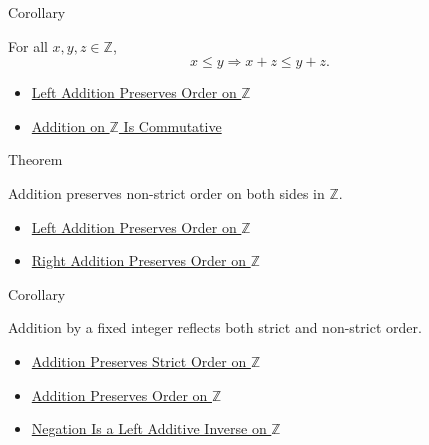 \begin{corollarybox}{Corollary}
\begin{corollary}
\label{cor:right-addition-preserves-order-on-z}
For all $x,y,z\in\mathbb{Z}$,
\[
x\le y \Longrightarrow x+z\le y+z.
\]
\end{corollary}
\end{corollarybox}

\begin{dependencies}
\begin{itemize}
  \item \hyperref[thm:left-addition-preserves-order-on-z]{Left Addition Preserves Order on $\mathbb{Z}$}
  \item \hyperref[thm:addition-on-z-commutative]{Addition on $\mathbb{Z}$ Is Commutative}
\end{itemize}
\end{dependencies}

\begin{theorembox}{Theorem}
\begin{theorem}
\label{thm:addition-preserves-order-on-z}
Addition preserves non-strict order on both sides in $\mathbb{Z}$.
\end{theorem}
\end{theorembox}

\begin{dependencies}
\begin{itemize}
  \item \hyperref[thm:left-addition-preserves-order-on-z]{Left Addition Preserves Order on $\mathbb{Z}$}
  \item \hyperref[cor:right-addition-preserves-order-on-z]{Right Addition Preserves Order on $\mathbb{Z}$}
\end{itemize}
\end{dependencies}

\begin{corollarybox}{Corollary}
\begin{corollary}
\label{cor:addition-reflects-order-on-z}
Addition by a fixed integer reflects both strict and non-strict order.
\end{corollary}
\end{corollarybox}

\begin{dependencies}
\begin{itemize}
  \item \hyperref[thm:addition-preserves-strict-order-on-z]{Addition Preserves Strict Order on $\mathbb{Z}$}
  \item \hyperref[thm:addition-preserves-order-on-z]{Addition Preserves Order on $\mathbb{Z}$}
  \item \hyperref[thm:negation-left-additive-inverse-on-z]{Negation Is a Left Additive Inverse on $\mathbb{Z}$}
\end{itemize}
\end{dependencies}

